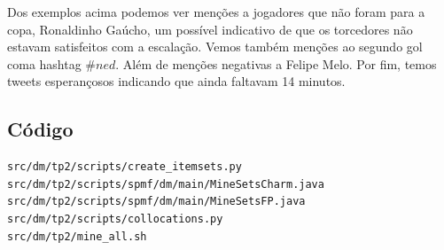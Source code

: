 \documentclass[brazil,a4paper,12pt]{article}
\begin{document}
Dos exemplos acima podemos ver menções a jogadores que não foram para
a copa, Ronaldinho Gaúcho, um possível indicativo de que os torcedores
não estavam satisfeitos com a escalação. Vemos também menções ao segundo
gol coma hashtag $\#ned$. Além de menções negativas a Felipe Melo. Por fim,
temos tweets esperançosos indicando que ainda faltavam 14 minutos.

\subsection{Código}

\begin{verbatim}
src/dm/tp2/scripts/create_itemsets.py
src/dm/tp2/scripts/spmf/dm/main/MineSetsCharm.java
src/dm/tp2/scripts/spmf/dm/main/MineSetsFP.java
src/dm/tp2/scripts/collocations.py
src/dm/tp2/mine_all.sh
\end{verbatim}



\end{document}

